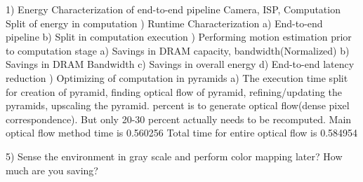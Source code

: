 1) Energy Characterization of end-to-end pipeline\newline
Camera, ISP, Computation \newline
Split of energy in computation \newline
{}) Runtime Characterization \newline
a) End-to-end pipeline\newline
b) Split in computation execution\newline
{}) Performing motion estimation prior to computation stage\newline
a) Savings in DRAM capacity, bandwidth(Normalized) \newline
b) Savings in DRAM Bandwidth\newline
c) Savings in overall energy\newline
d) End-to-end latency reduction\newline
{}) Optimizing of computation in pyramids \newline
a) The execution time split for creation of pyramid, finding optical flow of pyramid, refining/updating the pyramids, upscaling the pyramid.  percent is to generate optical flow(dense pixel correspondence). But only 20-30 percent actually needs to be recomputed.\newline
Main optical flow method time is 0.560256
Total time for entire optical flow is 0.584954   
 

 5) Sense the environment in gray scale and perform color mapping later? How much are you saving? 
	



